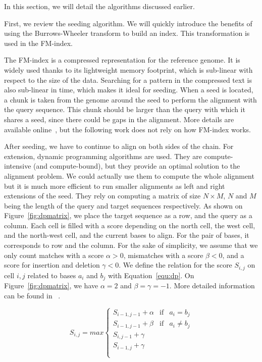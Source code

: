 In this section, we will detail the algorithms discussed earlier.

First, we review the seeding algorithm. We will quickly introduce the benefits of using the Burrows-Wheeler transform to build an index. This transformation is used in the FM-index.

The FM-index is a compressed representation for the reference genome. It is widely used thanks to its lightweight memory footprint, which is sub-linear with respect to the size of the data. Searching for a pattern in the compressed text is also sub-linear in time, which makes it ideal for seeding. When a seed is located, a chunk is taken from the genome around the seed to perform the alignment with the query sequence. This chunk should be larger than the query with which it shares a seed, since there could be gaps in the alignment. More details are available online~\cite{wiki:FMIndex}, but the following work does not rely on how FM-index works. 

After seeding, we have to continue to align on both sides of the chain. For extension, dynamic programming algorithms are used. They are compute-intensive (and compute-bound), but they provide an optimal solution to the alignment problem. We could actually use them to compute the whole alignment but it is much more efficient to run smaller alignments as left and right extensions of the seed. They rely on computing a matrix of size $N \times M$, $N$ and $M$ being the length of the query and target sequences respectively. As shown on Figure~\ref{fig:dpmatrix}, we place the target sequence as a row, and the query as a column. Each cell is filled with a score depending on the north cell, the west cell, and the north-west cell, and the current bases to align. For the pair of bases, it corresponds to row and the column. For the sake of simplicity, we assume that we only count matches with a score $\alpha > 0$, mismatches with a score $\beta < 0$, and a score for insertion and deletion $\gamma < 0$. We define the relation for the score $S_{i,j}$ on cell $i,j$ related to bases $a_i$ and $b_j$ with Equation~\ref{equ:dp}. On Figure~\ref{fig:dpmatrix}, we have $\alpha = 2$ and $\beta = \gamma = -1$. More detailed information can be found in ~\cite{Aluru:2005:HCM:1121650}.

\begin{equation}
	S_{i,j} = max \left\{
	\begin{array}{llll}
		S_{i-1, j-1} + \alpha & \mbox{if} & a_i = b_j \\
		S_{i-1, j-1} + \beta & \mbox{if} & a_i \neq b_j \\
		S_{i, j-1} + \gamma \\
		S_{i-1, j} + \gamma\\
		 \\
	\end{array}
	\right.
	\label{equ:dp}
\end{equation}



